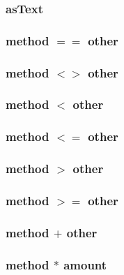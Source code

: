 \subsubsection{asText}

\subsubsection{method $==$ other}

\subsubsection{method $<>$ other}

\subsubsection{method $<$ other}

\subsubsection{method $<=$ other}

\subsubsection{method $>$ other}

\subsubsection{method $>=$ other}

\subsubsection{method $+$ other}

\subsubsection{method $*$ amount}
